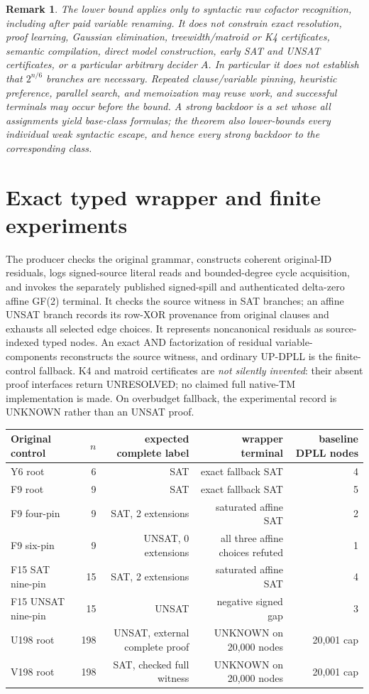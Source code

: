 \documentclass[11pt]{article}
\newtheorem{remark}{Remark}
\begin{document}
\begin{remark}
The lower bound applies only to \emph{syntactic raw cofactor} recognition, including after paid variable renaming. It does not constrain exact resolution, proof learning, Gaussian elimination, treewidth/matroid or K4 certificates, semantic compilation, direct model construction, early SAT and UNSAT certificates, or a particular arbitrary decider $A$. In particular it does not establish that $2^{n/6}$ branches are necessary. Repeated clause/variable pinning, heuristic preference, parallel search, and memoization may reuse work, and successful terminals may occur before the bound. A strong backdoor is a set whose \emph{all} assignments yield base-class formulas; the theorem also lower-bounds every individual weak syntactic escape, and hence every strong backdoor to the corresponding class.
\end{remark}

\section{Exact typed wrapper and finite experiments}
The producer  checks the original grammar, constructs coherent original-ID residuals, logs signed-source literal reads and bounded-degree cycle acquisition, and invokes the separately published signed-spill and authenticated delta-zero affine GF(2) terminal. It checks the source witness in SAT branches; an affine UNSAT branch records its row-XOR provenance from original clauses and exhausts all selected edge choices. It represents noncanonical residuals as source-indexed typed nodes. An exact AND factorization of residual variable-components reconstructs the source witness, and ordinary UP-DPLL is the finite-control fallback. K4 and matroid certificates are \emph{not silently invented}: their absent proof interfaces return UNRESOLVED; no claimed full native-TM implementation is made. On overbudget fallback, the experimental record is UNKNOWN rather than an UNSAT proof.

\begin{center}\begin{tabular}{lrrrr}\toprule
Original control & $n$ & expected complete label & wrapper terminal & baseline DPLL nodes\\\midrule
Y6 root &6& SAT & exact fallback SAT &4\\
F9 root &9& SAT & exact fallback SAT &5\\
F9 four-pin &9& SAT, 2 extensions & saturated affine SAT &2\\
F9 six-pin &9& UNSAT, 0 extensions & all three affine choices refuted &1\\
F15 SAT nine-pin &15& SAT, 2 extensions & saturated affine SAT &4\\
F15 UNSAT nine-pin &15& UNSAT & negative signed gap &3\\
U198 root &198& UNSAT, external complete proof & UNKNOWN on 20,000 nodes &20,001 cap\\
V198 root &198& SAT, checked full witness & UNKNOWN on 20,000 nodes &20,001 cap\\\bottomrule\end{tabular}\end{center}
\end{document}
